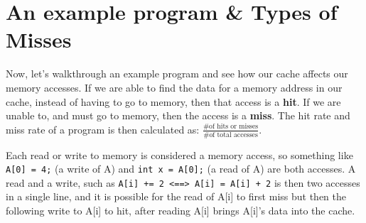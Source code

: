 \documentclass{article}
\begin{document}
\section{An example program \& Types of Misses}
Now, let's walkthrough an example program and see how our cache affects our memory accesses. If we are able to find the data for a memory address in our cache, instead of having to go to memory, then that access is a \textbf{hit}. If we are unable to, and must go to memory, then the access is a \textbf{miss}. The hit rate and miss rate of a program is then calculated as: $\frac{\text{\# of hits or misses}}{\text{\# of total accesses}}$. 

Each read or write to memory is considered a memory access, so something like \texttt{A[0] = 4;} (a write of A) and \texttt{int x = A[0];} (a read of A) are both accesses. A read and a write, such as \texttt{A[i] += 2 <==> A[i] = A[i] + 2} is then two accesses in a single line, and it is possible for the read of A[i] to first miss but then the following write to A[i] to hit, after reading A[i] brings A[i]'s data into the cache.
\end{document}
